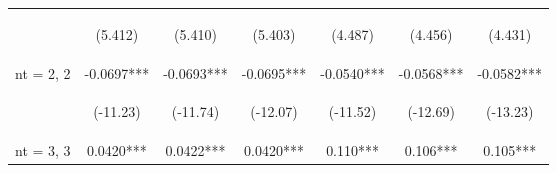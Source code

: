 \documentclass[]{article}
\begin{document}
\begin{center}
\begin{tabular}{lcccccc}
        \vspace{4pt}     & \begin{footnotesize}(5.412)\end{footnotesize}  & \begin{footnotesize}(5.410)\end{footnotesize}  & \begin{footnotesize}(5.403)\end{footnotesize}  & \begin{footnotesize}(4.487)\end{footnotesize}   & \begin{footnotesize}(4.456)\end{footnotesize}  & \begin{footnotesize}(4.431)\end{footnotesize}  \\
        nt = 2, 2        & -0.0697***                                     & -0.0693***                                     & -0.0695***                                     & -0.0540***                                      & -0.0568***                                     & -0.0582***                                     \\
        \vspace{4pt}     & \begin{footnotesize}(-11.23)\end{footnotesize} & \begin{footnotesize}(-11.74)\end{footnotesize} & \begin{footnotesize}(-12.07)\end{footnotesize} & \begin{footnotesize}(-11.52)\end{footnotesize}  & \begin{footnotesize}(-12.69)\end{footnotesize} & \begin{footnotesize}(-13.23)\end{footnotesize} \\
        nt = 3, 3        & 0.0420***                                      & 0.0422***                                      & 0.0420***                                      & 0.110***                                        & 0.106***                                       & 0.105***                                       \\

\end{tabular}
\end{center}
\end{document}
